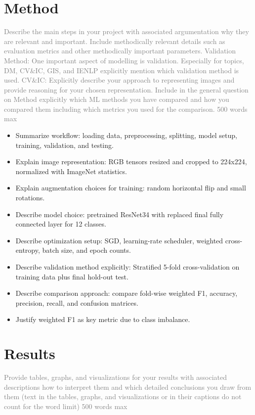 \documentclass{article}
\begin{document}
\section{Method}
\textcolor{gray}{Describe the main steps in your project with associated argumentation why they are relevant and important. Include methodically relevant details such as evaluation metrics and other methodically important parameters. Validation Method: One important aspect of modelling is validation. Especially for topics, DM, CV\&IC, GIS, and IENLP explicitly mention which validation method is used.
CV\&IC: Explicitly describe your approach to representing images and provide reasoning for your chosen representation. Include in the general question on Method explicitly which ML methods you have compared and how you compared them including which metrics you used for the comparison. 500 words max}

\begin{itemize}
    \item Summarize workflow: loading data, preprocessing, splitting, model setup, training, validation, and testing.
    \item Explain image representation: RGB tensors resized and cropped to 224x224, normalized with ImageNet statistics.
    \item Explain augmentation choices for training: random horizontal flip and small rotations.
    \item Describe model choice: pretrained ResNet34 with replaced final fully connected layer for 12 classes.
    \item Describe optimization setup: SGD, learning-rate scheduler, weighted cross-entropy, batch size, and epoch counts.
    \item Describe validation method explicitly: Stratified 5-fold cross-validation on training data plus final hold-out test.
    \item Describe comparison approach: compare fold-wise weighted F1, accuracy, precision, recall, and confusion matrices.
    \item Justify weighted F1 as key metric due to class imbalance.
\end{itemize}

\section{Results}
\textcolor{gray}{Provide tables, graphs, and visualizations for your results with associated descriptions how to interpret them and which detailed conclusions you draw from them (text in the tables, graphs, and visualizations or in their captions do not count for the word limit) 500 words max}
\end{document}
